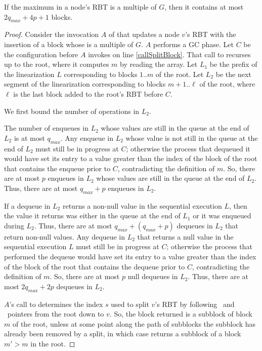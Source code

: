\begin{lemma}\label{boundAfterGC}
If the maximum  in a node's RBT is a multiple of $G$, then
it contains at most $2q_{max}+4p+1$ blocks.
\end{lemma}
\begin{proof}
Consider the invocation $A$ of  that updates a node $v$'s RBT with the insertion of a block whose 
 is a multiple of $G$.
$A$ performs a GC phase.
Let $C$ be the configuration before $A$ invokes  on line \ref{callSplitBlock}.
That call to  recurses up to the root, where it computes $m$ by reading the 
array.
Let $L_1$ be the prefix of the linearization $L$ corresponding to blocks $1..m$ of the root.
Let $L_2$ be the next segment of the linearization corresponding to blocks $m+1..\ell$ of the root, where
$\ell$ is the last block added to the root's RBT before $C$.

We first bound the number of operations in $L_2$.

The number of enqueues in $L_2$ whose values are still in the queue at the end of $L_2$ is at most $q_{max}$.
Any enqueue in $L_2$ whose value is not still in the queue at the end of $L_2$
must still be in progress at $C$; otherwise the process that dequeued it would have
set its  entry to a value greater than the index of the block of the root that contains the enqueue prior to $C$,
contradicting the definition of $m$.
So, there are at most $p$ enqueues in $L_2$ whose values are still in the queue at the end of $L_2$.
Thus, there are at most $q_{max}+p$ enqueues in $L_2$.

If a dequeue in $L_2$ returns a non-null value in the sequential execution $L$,
then the value it returns was either in the queue at the end of $L_1$ or it was enqueued during $L_2$.
Thus, there are at most $q_{max}+(q_{max}+p)$ dequeues in $L_2$ that return non-null values.
Any dequeue in $L_2$ that returns a null value in the sequential execution $L$ must still be in progress
at $C$; otherwise the process that performed the dequeue would have set its  entry
to a value greater than the index of the block of the root that contains the dequeue prior to $C$, 
contradicting the definition of $m$.
So, there are at most $p$ null dequeues in $L_2$.
Thus, there are at most $2q_{max} + 2p$ dequeues in $L_2$.

$A$'s call to  determines the index $s$ used to split $v$'s RBT by following 
\eleft\ and \eright\ pointers from the root down to $v$.
So, the block returned is a subblock of block $m$ of the root, unless
at some point along the path of subblocks the subblock has already been removed by a split,
in which case  returns a subblock of a block $m'>m$ in the root.


\end{proof}
